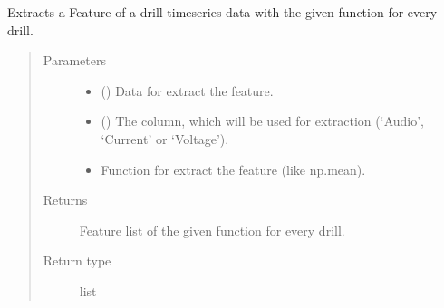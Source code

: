 \documentclass[letterpaper,10pt,english]{sphinxmanual}
\begin{document}

\begin{fulllineitems}
\label{\detokenize{anoog.io:anoog.io.data_io.extract_feature}}
\sphinxAtStartPar
Extracts a Feature of a drill timeseries data with the given function for every drill.
\begin{quote}\begin{description}
\item[{Parameters}] \leavevmode\begin{itemize}
\item {} 
\sphinxAtStartPar
{} () \textendash{} Data for extract the feature.

\item {} 
\sphinxAtStartPar
{} () \textendash{} The column, which will be used for extraction (‘Audio’, ‘Current’ or ‘Voltage’).

\item {} 
\sphinxAtStartPar
{} \textendash{} Function for extract the feature (like np.mean).

\end{itemize}

\item[{Returns}] \leavevmode
\sphinxAtStartPar
Feature list of the given function for every drill.

\item[{Return type}] \leavevmode
\sphinxAtStartPar
list

\end{description}\end{quote}

\end{fulllineitems}

\end{document}

